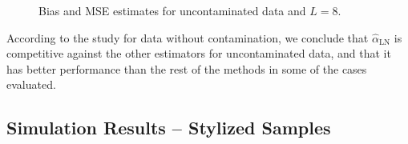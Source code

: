 \documentclass[twocolumn]{svjour3}
\begin{document}
\begin{figure}[htb]
	\centering
	\caption{\label{SesgoyECMSinContL=8}\small Bias and MSE estimates for uncontaminated data and $L=8$.}
\end{figure}

According to the study for data without contamination, we conclude that $\widehat{\alpha}_{\text{{LN}}}$ is competitive against the other estimators for uncontaminated data, and that it has better performance than the rest of the methods in some of the cases evaluated.

\subsection{Simulation Results -- Stylized Samples}
\label{StylizedSamples}
\end{document}
